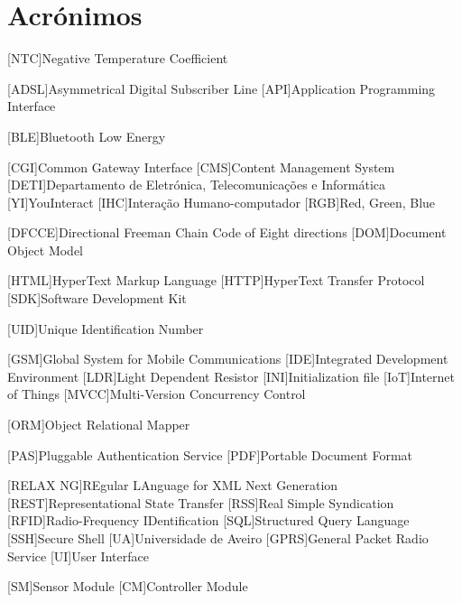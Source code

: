 \chapter*{Acrónimos}

\begin{acronym}[RELAX NG]
	
	[NTC]{Negative Temperature Coefficient}
			
	[ADSL]{Asymmetrical Digital Subscriber Line}
	[API]{Application Programming Interface}
	
	[BLE]{Bluetooth Low Energy}
	
	[CGI]{Common Gateway Interface}
	[CMS]{Content Management System}
	[DETI]{Departamento de Eletrónica, Telecomunicações e Informática}
	[YI]{YouInteract}		
	[IHC]{Interação Humano-computador}	
	[RGB]{Red, Green, Blue}
	
	[DFCCE]{Directional Freeman Chain Code of Eight directions}
	[DOM]{Document Object Model}
	
	[HTML]{HyperText Markup Language}
	[HTTP]{HyperText Transfer Protocol}		
	[SDK]{Software Development Kit}
	
	[UID]{Unique Identification Number}
	
	
	[GSM]{Global System for Mobile Communications}
	[IDE]{Integrated Development Environment}
	[LDR]{Light Dependent Resistor}
	[INI]{Initialization file}	
	[IoT]{Internet of Things}			
	[MVCC]{Multi-Version Concurrency Control}		

	[ORM]{Object Relational Mapper}
	
	[PAS]{Pluggable Authentication Service}
	[PDF]{Portable Document Format}
	
	[RELAX NG]{REgular LAnguage for XML Next Generation}
	[REST]{Representational State Transfer}
	[RSS]{Real Simple Syndication}
	[RFID]{Radio-Frequency IDentification}
	[SQL]{Structured Query Language}		
	[SSH]{Secure Shell}
	[UA]{Universidade de Aveiro}
	[GPRS]{General Packet Radio Service}
	[UI]{User Interface}
	
	[SM]{Sensor Module}
	[CM]{Controller Module}
	

\end{acronym}
